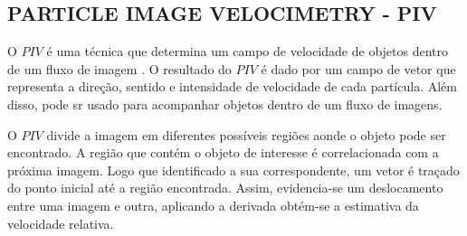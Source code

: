 \subsection{PARTICLE IMAGE VELOCIMETRY - PIV}

O $PIV$ é uma técnica que determina um campo de velocidade de objetos dentro de um fluxo de imagem \cite{Bastiaans}.
O resultado do $PIV$ é dado por um campo de vetor que representa a direção, sentido e intensidade de velocidade de cada 
partícula. Além disso, pode sr usado para acompanhar objetos dentro de um fluxo de imagens.

O $PIV$ divide a imagem em diferentes possíveis regiões aonde o objeto pode ser encontrado. A região que contém o objeto de 
interesse é correlacionada com a próxima imagem. Logo que identificado a sua correspondente, um vetor é traçado do ponto inicial
até a região encontrada. Assim, evidencia-se um deslocamento entre uma imagem e outra, aplicando a derivada 
obtém-se a estimativa da velocidade relativa.

